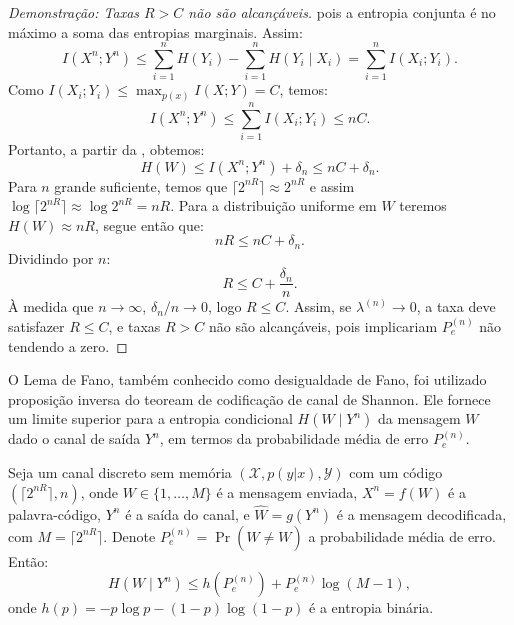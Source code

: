 \begin{proof}[Demonstração: Taxas $R > C$ não são alcançáveis]
pois a entropia conjunta é no máximo a soma das entropias marginais. Assim:
\begin{equation}
I(X^n; Y^n) \leq \sum_{i=1}^n H(Y_i) - \sum_{i=1}^n H(Y_i \mid X_i) = \sum_{i=1}^n I(X_i; Y_i).
\end{equation}
Como $I(X_i; Y_i) \leq \max_{p(x)} I(X; Y) = C$, temos:
\begin{equation}
I(X^n; Y^n) \leq \sum_{i=1}^n I(X_i; Y_i) \leq nC.
\end{equation}
Portanto, a partir da , obtemos:
\begin{equation}
H(W) \leq I(X^n; Y^n) + \delta_n \leq nC + \delta_n.
\end{equation}
Para $n$ grande suficiente, temos que $\lceil 2^{nR} \rceil \approx 2^{nR}$ e assim
$\log \lceil 2^{nR} \rceil \approx \log 2^{nR} = nR$. Para a distribuição uniforme em $W$
teremos $H(W) \approx nR$, segue então que:
\begin{equation}
nR \leq nC + \delta_n.
\end{equation}
Dividindo por $n$:
\begin{equation}
R \leq C + \frac{\delta_n}{n}.
\end{equation}
À medida que $n \to \infty$, $\delta_n/n \to 0$, logo $R \leq C$.
Assim, se $\lambda^{(n)} \to 0$, a taxa deve satisfazer $R \leq C$, e taxas 
$R > C$ não são alcançáveis, pois implicariam $P_e^{(n)}$ não tendendo a zero.
\end{proof}




O Lema de Fano, também conhecido como desigualdade de Fano,
foi utilizado proposição inversa do teoream de codificação de canal de Shannon. 
Ele fornece um limite superior para a entropia condicional $H(W \mid Y^n)$
da mensagem $W$ dado o canal de saída $Y^n$, em termos da probabilidade média
de erro $P_e^{(n)}$.



\begin{lemma}\label{lm:desfanocanal}
Seja um canal discreto sem memória $(\mathcal{X}, p(y|x), \mathcal{Y})$ com um código 
$(\lceil 2^{nR} \rceil, n)$, onde $W \in \{1, \ldots, M\}$ é a mensagem enviada, 
$X^n = f(W)$ é a palavra-código, $Y^n$ é a saída do canal, e $\hat{W} = g(Y^n)$ é a
mensagem decodificada, com $M = \lceil 2^{nR} \rceil$. Denote 
$P_e^{(n)} = \Pr(\hat{W} \neq W)$ a probabilidade média de erro. Então:
\begin{equation}
H(W \mid Y^n) \leq h(P_e^{(n)}) + P_e^{(n)} \log (M - 1),
\end{equation}
onde $h(p) = -p \log p - (1-p) \log (1-p)$ é a entropia binária.
\end{lemma}


